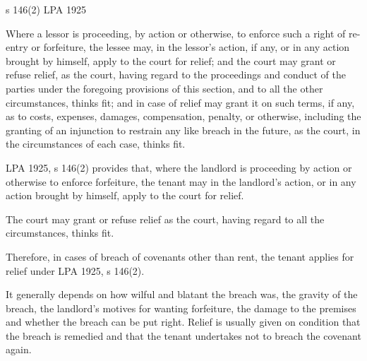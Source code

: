 \documentclass[
]{article}
\newenvironment{env-2aad614f-6fd6-4025-876c-fcdbeae766fb}
{
    \savenotes\tcolorbox[blanker,breakable,left=5pt,borderline west={2pt}{-4pt}{green}]
}
{
    \endtcolorbox\spewnotes
}
\begin{document}
\begin{env-2aad614f-6fd6-4025-876c-fcdbeae766fb}

s 146(2) LPA 1925

Where a lessor is proceeding, by action or otherwise, to enforce such a
right of re-entry or forfeiture, the lessee may, in the lessor's action,
if any, or in any action brought by himself, apply to the court for
relief; and the court may grant or refuse relief, as the court, having
regard to the proceedings and conduct of the parties under the foregoing
provisions of this section, and to all the other circumstances, thinks
fit; and in case of relief may grant it on such terms, if any, as to
costs, expenses, damages, compensation, penalty, or otherwise, including
the granting of an injunction to restrain any like breach in the future,
as the court, in the circumstances of each case, thinks fit.

\end{env-2aad614f-6fd6-4025-876c-fcdbeae766fb}

LPA 1925, s 146(2) provides that, where the landlord is proceeding by
action or otherwise to enforce forfeiture, the tenant may in the
landlord's action, or in any action brought by himself, apply to the
court for relief.

The court may grant or refuse relief as the court, having regard to all
the circumstances, thinks fit.

Therefore, in cases of breach of covenants other than rent, the tenant
applies for relief under LPA 1925, s 146(2).

It generally depends on how wilful and blatant the breach was, the
gravity of the breach, the landlord's motives for wanting forfeiture,
the damage to the premises and whether the breach can be put right.
Relief is usually given on condition that the breach is remedied and
that the tenant undertakes not to breach the covenant again.
\end{document}
